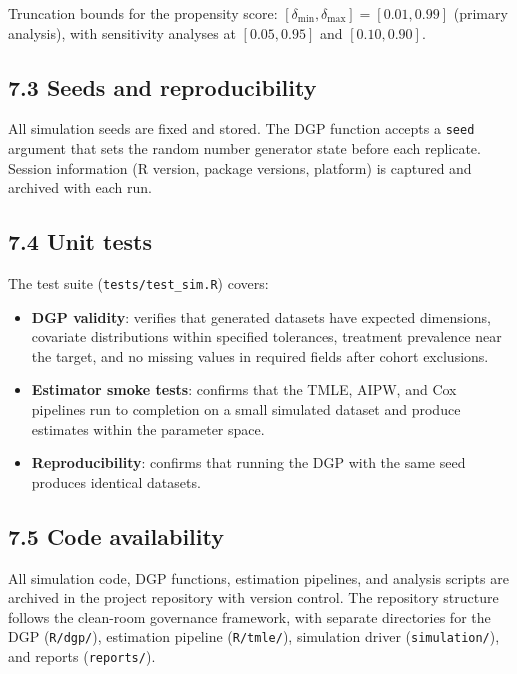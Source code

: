 \documentclass[
  letterpaper,
  DIV=11,
  numbers=noendperiod]{scrartcl}
\providecommand{\tightlist}{%
  \setlength{\itemsep}{0pt}\setlength{\parskip}{0pt}}\usepackage{longtable,booktabs,array}
\begin{document}
Truncation bounds for the propensity score:
\([\delta_{\min}, \delta_{\max}] = [0.01, 0.99]\) (primary analysis),
with sensitivity analyses at \([0.05, 0.95]\) and \([0.10, 0.90]\).

\subsection{7.3 Seeds and
reproducibility}\label{seeds-and-reproducibility}

All simulation seeds are fixed and stored. The DGP function accepts a
\texttt{seed} argument that sets the random number generator state
before each replicate. Session information (R version, package versions,
platform) is captured and archived with each run.

\subsection{7.4 Unit tests}\label{unit-tests}

The test suite (\texttt{tests/test\_sim.R}) covers:

\begin{itemize}
\tightlist
\item
  \textbf{DGP validity}: verifies that generated datasets have expected
  dimensions, covariate distributions within specified tolerances,
  treatment prevalence near the target, and no missing values in
  required fields after cohort exclusions.
\item
  \textbf{Estimator smoke tests}: confirms that the TMLE, AIPW, and Cox
  pipelines run to completion on a small simulated dataset and produce
  estimates within the parameter space.
\item
  \textbf{Reproducibility}: confirms that running the DGP with the same
  seed produces identical datasets.
\end{itemize}

\subsection{7.5 Code availability}\label{code-availability}

All simulation code, DGP functions, estimation pipelines, and analysis
scripts are archived in the project repository with version control. The
repository structure follows the clean-room governance framework, with
separate directories for the DGP (\texttt{R/dgp/}), estimation pipeline
(\texttt{R/tmle/}), simulation driver (\texttt{simulation/}), and
reports (\texttt{reports/}).
\end{document}
